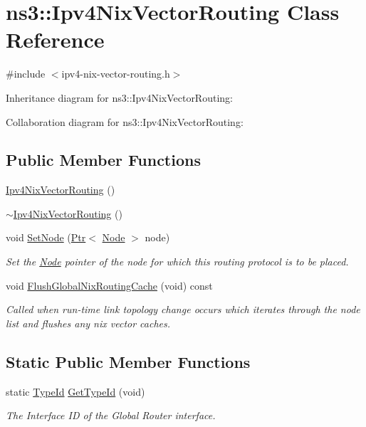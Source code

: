 \hypertarget{classns3_1_1Ipv4NixVectorRouting}{}\section{ns3\+:\+:Ipv4\+Nix\+Vector\+Routing Class Reference}
\label{classns3_1_1Ipv4NixVectorRouting}


{\ttfamily \#include $<$ipv4-\/nix-\/vector-\/routing.\+h$>$}



Inheritance diagram for ns3\+:\+:Ipv4\+Nix\+Vector\+Routing\+:


Collaboration diagram for ns3\+:\+:Ipv4\+Nix\+Vector\+Routing\+:
\subsection*{Public Member Functions}
\begin{DoxyCompactItemize}
\item 
\hyperlink{classns3_1_1Ipv4NixVectorRouting_a0aa865407f4e446e5afb3c83e718e9c7}{Ipv4\+Nix\+Vector\+Routing} ()
\item 
\hyperlink{classns3_1_1Ipv4NixVectorRouting_a3ce17fb8675e93a607b491232471f685}{$\sim$\+Ipv4\+Nix\+Vector\+Routing} ()
\item 
void \hyperlink{classns3_1_1Ipv4NixVectorRouting_a6a038800279f64332101463c5c393cff}{Set\+Node} (\hyperlink{classns3_1_1Ptr}{Ptr}$<$ \hyperlink{classns3_1_1Node}{Node} $>$ node)
\begin{DoxyCompactList}\small\item\em Set the \hyperlink{classns3_1_1Node}{Node} pointer of the node for which this routing protocol is to be placed. \end{DoxyCompactList}\item 
void \hyperlink{classns3_1_1Ipv4NixVectorRouting_acbd7460ba116c4b5ff830fb1d60a13ea}{Flush\+Global\+Nix\+Routing\+Cache} (void) const 
\begin{DoxyCompactList}\small\item\em Called when run-\/time link topology change occurs which iterates through the node list and flushes any nix vector caches. \end{DoxyCompactList}\end{DoxyCompactItemize}
\subsection*{Static Public Member Functions}
\begin{DoxyCompactItemize}
\item 
static \hyperlink{classns3_1_1TypeId}{Type\+Id} \hyperlink{classns3_1_1Ipv4NixVectorRouting_aeebea623bb7d67844520b2c340c4628c}{Get\+Type\+Id} (void)
\begin{DoxyCompactList}\small\item\em The Interface ID of the Global Router interface. \end{DoxyCompactList}\end{DoxyCompactItemize}
